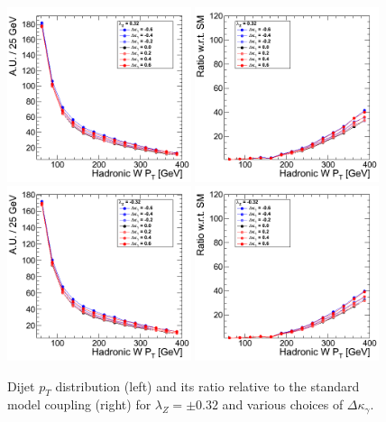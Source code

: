 \begin{figure}[h!t]
  {\centering
    \includegraphics[width=0.48\textwidth]{figs/HadronicWpT_032.png}
    \includegraphics[width=0.48\textwidth]{figs/HadronicWpT_032_ratio.png}
    \includegraphics[width=0.48\textwidth]{figs/HadronicWpT_m032.png}
    \includegraphics[width=0.48\textwidth]{figs/HadronicWpT_m032_ratio.png}
    \caption{Dijet $p_T$ distribution (left) and its ratio relative to 
    the standard model coupling (right) for $\lambda_Z = \pm 0.32$ and various choices of $\Delta{\kappa_\gamma}$.}
    \label{fig:ww_dijetPt_atgcRatio032}}
\end{figure}

